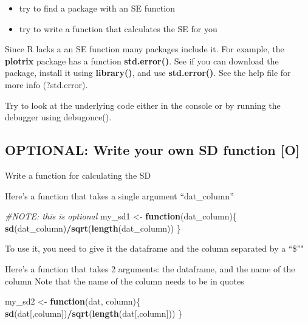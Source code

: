 \documentclass[]{book}
\newenvironment{Shaded}{\begin{snugshade}}{\end{snugshade}}
\newcommand{\KeywordTok}[1]{\textcolor[rgb]{0.13,0.29,0.53}{\textbf{#1}}}
\newcommand{\StringTok}[1]{\textcolor[rgb]{0.31,0.60,0.02}{#1}}
\newcommand{\CommentTok}[1]{\textcolor[rgb]{0.56,0.35,0.01}{\textit{#1}}}
\newcommand{\ControlFlowTok}[1]{\textcolor[rgb]{0.13,0.29,0.53}{\textbf{#1}}}
\newcommand{\OperatorTok}[1]{\textcolor[rgb]{0.81,0.36,0.00}{\textbf{#1}}}
\newcommand{\NormalTok}[1]{#1}
\providecommand{\tightlist}{%
  \setlength{\itemsep}{0pt}\setlength{\parskip}{0pt}}
\theoremstyle{definition}
\theoremstyle{definition}
\theoremstyle{definition}
\theoremstyle{remark}
\begin{document}
\begin{itemize}
\tightlist
\item
  try to find a package with an SE function
\item
  try to write a function that calculates the SE for you
\end{itemize}

Since R lacks a an SE function many packages include it. For example,
the \textbf{plotrix} package has a function \textbf{std.error()}. See if
you can download the package, install it using \textbf{library()}, and
use \textbf{std.error()}. See the help file for more info (?std.error).

Try to look at the underlying code either in the console or by running
the debugger using debugonce().

\subsection{OPTIONAL: Write your own SD function
{[}O{]}}\label{optional-write-your-own-sd-function-o}

Write a function for calculating the SD

Here's a function that takes a single argument ``dat\_column''

\begin{Shaded}
\begin{Highlighting}[]
\CommentTok{#NOTE: this is optional}
\NormalTok{my_sd1 <-}\StringTok{ }\ControlFlowTok{function}\NormalTok{(dat_column)\{}
  \KeywordTok{sd}\NormalTok{(dat_column)}\OperatorTok{/}\KeywordTok{sqrt}\NormalTok{(}\KeywordTok{length}\NormalTok{(dat_column))}
\NormalTok{\}}
\end{Highlighting}
\end{Shaded}

To use it, you need to give it the dataframe and the column separated by
a ``\$''"

\begin{Shaded}
\end{Shaded}

Here's a function that takes 2 arguments: the dataframe, and the name of
the column Note that the name of the column needs to be in quotes

\begin{Shaded}
\begin{Highlighting}[]
\NormalTok{my_sd2 <-}\StringTok{ }\ControlFlowTok{function}\NormalTok{(dat, column)\{}
  \KeywordTok{sd}\NormalTok{(dat[,column])}\OperatorTok{/}\KeywordTok{sqrt}\NormalTok{(}\KeywordTok{length}\NormalTok{(dat[,column]))}
\NormalTok{\}}
\end{Highlighting}
\end{Shaded}
\end{document}
